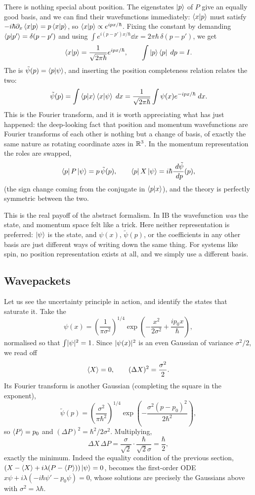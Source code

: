 \documentclass[a4paper]{scrartcl}
\begin{document}
There is nothing special about position. The eigenstates $\ket{p}$ of $P$ give an equally good basis, and we can find their wavefunctions immediately: $\braket{x}{p}$ must satisfy $-i\hbar \partial_x \braket{x}{p} = p \braket{x}{p}$, so $\braket{x}{p} \propto e^{ipx/\hbar}$. Fixing the constant by demanding $\braket{p}{p'} = \delta(p-p')$ and using $\int e^{i(p - p')x/\hbar}\dd x = 2\pi\hbar \, \delta(p-p')$, we get
$$
\braket{x}{p} = \frac{1}{\sqrt{2\pi\hbar}} e^{ipx/\hbar}, \qquad \int \ket{p}\bra{p} \; d p = I.
$$
The  is $\tilde\psi(p) = \braket{p}{\psi}$, and inserting the position completeness relation relates the two:
$$
\tilde\psi(p) = \int \braket{p}{x}\braket{x}{\psi}\; d x = \frac{1}{\sqrt{2\pi\hbar}}\int \psi(x) e^{-ipx/\hbar} \; d x.
$$
This is the Fourier transform, and it is worth appreciating what has just happened: the deep-looking fact that position and momentum wavefunctions are Fourier transforms of each other is nothing but a change of basis, of exactly the same nature as rotating coordinate axes in $\mathbb{R}^3$. In the momentum representation the roles are swapped,
$$
\bra{p}P\ket{\psi} = p\,\tilde\psi(p), \qquad \bra{p}X\ket{\psi} = i\hbar\frac{\; d\tilde\psi}{\; d p}(p),
$$
(the sign change coming from the conjugate in $\braket{p}{x}$), and the theory is perfectly symmetric between the two.

\begin{remark}
    This is the real payoff of the abstract formalism. In IB the wavefunction \emph{was} the state, and momentum space felt like a trick. Here neither representation is preferred: $\ket{\psi}$ is the state, and $\psi(x)$, $\tilde\psi(p)$, or the coefficients in any other basis are just different ways of writing down the same thing. For systems like spin, no position representation exists at all, and we simply use a different basis.
\end{remark}

\subsection{Wavepackets}\label{sec:wavepackets}

Let us see the uncertainty principle in action, and identify the states that saturate it. Take the 
$$
\psi(x) = \left(\frac{1}{\pi \sigma^2}\right)^{1/4} \exp\left(-\frac{x^2}{2\sigma^2} + \frac{i p_0 x}{\hbar}\right),
$$
normalised so that $\int \lvert\psi\rvert^2 = 1$. Since $\lvert\psi(x)\rvert^2$ is an even Gaussian of variance $\sigma^2/2$, we read off
$$
\expval{X} = 0, \qquad (\Delta X)^2 = \frac{\sigma^2}{2}.
$$
Its Fourier transform is another Gaussian (completing the square in the exponent),
$$
\tilde\psi(p) = \left(\frac{\sigma^2}{\pi\hbar^2}\right)^{1/4} \exp\left( -\frac{\sigma^2 (p-p_0)^2}{2\hbar^2} \right),
$$
so $\expval{P} = p_0$ and $(\Delta P)^2 = \hbar^2/2\sigma^2$. Multiplying,
$$
\Delta X \, \Delta P = \frac{\sigma}{\sqrt2}\cdot\frac{\hbar}{\sqrt2 \sigma} = \frac{\hbar}{2},
$$
exactly the minimum. Indeed the equality condition of the previous section, $(X - \expval{X} + i\lambda(P - \expval{P}))\ket{\psi} = 0$, becomes the first-order ODE $x\psi + i\lambda(-i\hbar\psi' - p_0\psi) = 0$, whose solutions are precisely the Gaussians above with $\sigma^2 = \lambda\hbar$.
\end{document}
